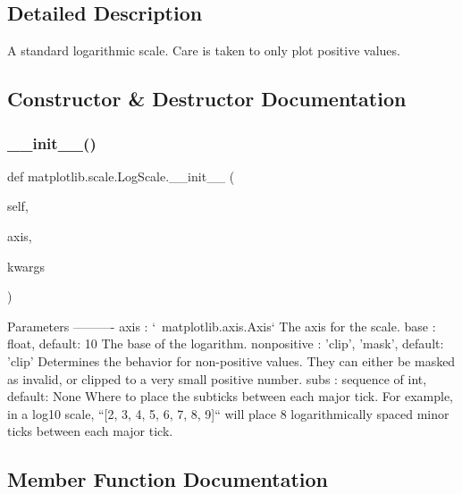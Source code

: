 \subsection{Detailed Description}
\begin{DoxyVerb}A standard logarithmic scale.  Care is taken to only plot positive values.
\end{DoxyVerb}
 

\subsection{Constructor \& Destructor Documentation}
\mbox{\label{classmatplotlib_1_1scale_1_1LogScale_a002cc58f3b849415280acc91715748e8}} 
\subsubsection{\texorpdfstring{\+\_\+\+\_\+init\+\_\+\+\_\+()}{\_\_init\_\_()}}
{\footnotesize\ttfamily def matplotlib.\+scale.\+Log\+Scale.\+\_\+\+\_\+init\+\_\+\+\_\+ (\begin{DoxyParamCaption}\item[{}]{self,  }\item[{}]{axis,  }\item[{}]{kwargs }\end{DoxyParamCaption})}

\begin{DoxyVerb}Parameters
----------
axis : `~matplotlib.axis.Axis`
    The axis for the scale.
base : float, default: 10
    The base of the logarithm.
nonpositive : {'clip', 'mask'}, default: 'clip'
    Determines the behavior for non-positive values. They can either
    be masked as invalid, or clipped to a very small positive number.
subs : sequence of int, default: None
    Where to place the subticks between each major tick.  For example,
    in a log10 scale, ``[2, 3, 4, 5, 6, 7, 8, 9]`` will place 8
    logarithmically spaced minor ticks between each major tick.
\end{DoxyVerb}
 

\subsection{Member Function Documentation}
\mbox{\label{classmatplotlib_1_1scale_1_1LogScale_ad2c46e6c35a5f95d07d3beaa767767b2}} 
